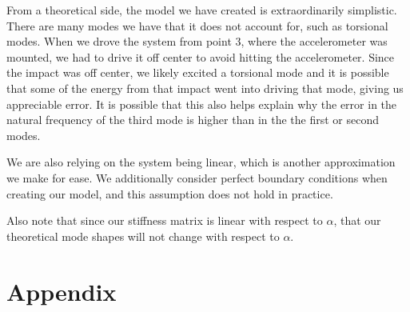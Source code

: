 \documentclass{article}
\begin{document}
From a theoretical side, the model we have created is extraordinarily simplistic. There are many modes we have that it does not account for, such as torsional modes. When we drove the system from point 3, where the accelerometer was mounted, we had to drive it off center to avoid hitting the accelerometer. Since the impact was off center, we likely excited a torsional mode and it is possible that some of the energy from that impact went into driving that mode, giving us appreciable error. It is possible that this also helps explain why the error in the natural frequency of the third mode is higher than in the the first or second modes. 

We are also relying on the system being linear, which is another approximation we make for ease. We additionally consider perfect boundary conditions when creating our model, and this assumption does not hold in practice. 

Also note that since our stiffness matrix is linear with respect to $\alpha$, that our theoretical mode shapes will not change with respect to $\alpha$.
\newpage
\section*{Appendix}
\end{document}
